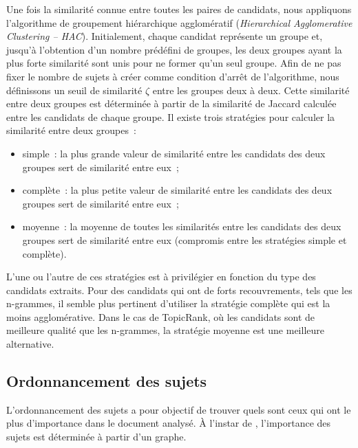         Une fois la similarité connue entre toutes les paires de candidats, nous
        appliquons l'algorithme de groupement hiérarchique agglomératif
        (\textit{Hierarchical Agglomerative Clustering -- HAC}). Initialement,
        chaque candidat représente un groupe et, jusqu'à l'obtention d'un nombre
        prédéfini de groupes, les deux groupes ayant la plus forte similarité
        sont unis pour ne former qu'un seul groupe. Afin de ne pas fixer le
        nombre de sujets à créer comme condition d'arrêt de l'algorithme, nous
        définissons un seuil de similarité $\zeta$ entre les groupes deux à
        deux. Cette similarité entre deux groupes est déterminée à partir de la
        similarité de Jaccard calculée entre les candidats de chaque groupe. Il
        existe trois stratégies pour calculer la similarité entre deux groupes~:
        \begin{itemize}
          \item{simple~: la plus grande valeur de similarité entre les candidats
                des deux groupes sert de similarité entre eux~;}
          \item{complète~: la plus petite valeur de similarité entre les
                candidats des deux groupes sert de similarité entre eux~;}
          \item{moyenne~: la moyenne de toutes les similarités entre les
                candidats des deux groupes sert de similarité entre eux
                (compromis entre les stratégies simple et complète).}
        \end{itemize}
        L'une ou l'autre de ces stratégies est à privilégier en fonction du type
        des candidats extraits. Pour des candidats qui ont de forts
        recouvrements, tels que les n-grammes, il semble plus pertinent
        d'utiliser la stratégie complète qui est la moins agglomérative. Dans le
        cas de TopicRank, où les candidats sont de meilleure qualité que les
        n-grammes, la stratégie moyenne est une meilleure alternative.

      \subsection{Ordonnancement des sujets}
      \label{sec:main-automatic_keyphrase_annotation-unsupervised_automatic_keyphrase_extraction-topicrank-topic_ranking}
        L'ordonnancement des sujets a pour objectif de trouver quels sont ceux
        qui ont le plus d'importance dans le document analysé. À l'instar de
        , l'importance des sujets est déterminée à
        partir d'un graphe.

